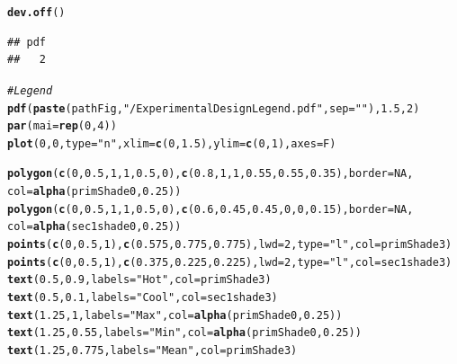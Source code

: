 \documentclass[11pt, oneside]{article}\usepackage[]{graphicx}\usepackage[]{color}
\makeatletter
\newcommand{\hlnum}[1]{\textcolor[rgb]{0.686,0.059,0.569}{#1}}%
\newcommand{\hlstr}[1]{\textcolor[rgb]{0.192,0.494,0.8}{#1}}%
\newcommand{\hlcom}[1]{\textcolor[rgb]{0.678,0.584,0.686}{\textit{#1}}}%
\newcommand{\hlstd}[1]{\textcolor[rgb]{0.345,0.345,0.345}{#1}}%
\newcommand{\hlkwc}[1]{\textcolor[rgb]{0.333,0.667,0.333}{#1}}%
\newcommand{\hlkwd}[1]{\textcolor[rgb]{0.737,0.353,0.396}{\textbf{#1}}}%
\newenvironment{kframe}{%
 \def\at@end@of@kframe{}%
 \ifinner\ifhmode%
  \def\at@end@of@kframe{\end{minipage}}%
  \begin{minipage}{\columnwidth}%
 \fi\fi%
 \def\FrameCommand##1{\hskip\@totalleftmargin \hskip-\fboxsep
 \colorbox{shadecolor}{##1}\hskip-\fboxsep
     \hskip-\linewidth \hskip-\@totalleftmargin \hskip\columnwidth}%
 \MakeFramed {\advance\hsize-\width
   \@totalleftmargin\z@ \linewidth\hsize
   \@setminipage}}%
 {\par\unskip\endMakeFramed%
 \at@end@of@kframe}
\newenvironment{knitrout}{}{} %
\makeatother
\begin{document}
\begin{knitrout}
\begin{kframe}
\begin{alltt}
\hlkwd{dev.off}\hlstd{()}
\end{alltt}
\begin{verbatim}
## pdf 
##   2
\end{verbatim}
\begin{alltt}
\hlcom{# Legend}
\hlkwd{pdf}\hlstd{(}\hlkwd{paste}\hlstd{(pathFig,} \hlstr{"/ExperimentalDesignLegend.pdf"}\hlstd{,} \hlkwc{sep} \hlstd{=} \hlstr{""}\hlstd{),} \hlnum{1.5}\hlstd{,} \hlnum{2}\hlstd{)}
\hlkwd{par}\hlstd{(}\hlkwc{mai} \hlstd{=} \hlkwd{rep}\hlstd{(}\hlnum{0}\hlstd{,} \hlnum{4}\hlstd{))}
\hlkwd{plot}\hlstd{(}\hlnum{0}\hlstd{,} \hlnum{0}\hlstd{,} \hlkwc{type} \hlstd{=} \hlstr{"n"}\hlstd{,} \hlkwc{xlim} \hlstd{=} \hlkwd{c}\hlstd{(}\hlnum{0}\hlstd{,} \hlnum{1.5}\hlstd{),} \hlkwc{ylim} \hlstd{=} \hlkwd{c}\hlstd{(}\hlnum{0}\hlstd{,} \hlnum{1}\hlstd{),} \hlkwc{axes} \hlstd{= F)}

\hlkwd{polygon}\hlstd{(}\hlkwd{c}\hlstd{(}\hlnum{0}\hlstd{,} \hlnum{0.5}\hlstd{,} \hlnum{1}\hlstd{,} \hlnum{1}\hlstd{,} \hlnum{0.5}\hlstd{,} \hlnum{0}\hlstd{),} \hlkwd{c}\hlstd{(}\hlnum{0.8}\hlstd{,} \hlnum{1}\hlstd{,} \hlnum{1}\hlstd{,} \hlnum{0.55}\hlstd{,} \hlnum{0.55}\hlstd{,} \hlnum{0.35}\hlstd{),} \hlkwc{border} \hlstd{=} \hlnum{NA}\hlstd{,}
                                \hlkwc{col} \hlstd{=} \hlkwd{alpha}\hlstd{(primShade0,} \hlnum{0.25}\hlstd{))}
\hlkwd{polygon}\hlstd{(}\hlkwd{c}\hlstd{(}\hlnum{0}\hlstd{,} \hlnum{0.5}\hlstd{,} \hlnum{1}\hlstd{,} \hlnum{1}\hlstd{,} \hlnum{0.5}\hlstd{,} \hlnum{0}\hlstd{),} \hlkwd{c}\hlstd{(}\hlnum{0.6}\hlstd{,} \hlnum{0.45}\hlstd{,} \hlnum{0.45}\hlstd{,} \hlnum{0}\hlstd{,} \hlnum{0}\hlstd{,} \hlnum{0.15}\hlstd{),} \hlkwc{border} \hlstd{=} \hlnum{NA}\hlstd{,}
                                \hlkwc{col} \hlstd{=} \hlkwd{alpha}\hlstd{(sec1shade0,} \hlnum{0.25}\hlstd{))}
\hlkwd{points}\hlstd{(}\hlkwd{c}\hlstd{(}\hlnum{0}\hlstd{,} \hlnum{0.5}\hlstd{,} \hlnum{1}\hlstd{),} \hlkwd{c}\hlstd{(}\hlnum{0.575}\hlstd{,} \hlnum{0.775}\hlstd{,} \hlnum{0.775}\hlstd{),} \hlkwc{lwd} \hlstd{=} \hlnum{2}\hlstd{,} \hlkwc{type} \hlstd{=} \hlstr{"l"}\hlstd{,} \hlkwc{col} \hlstd{= primShade3)}
\hlkwd{points}\hlstd{(}\hlkwd{c}\hlstd{(}\hlnum{0}\hlstd{,} \hlnum{0.5}\hlstd{,} \hlnum{1}\hlstd{),} \hlkwd{c}\hlstd{(}\hlnum{0.375}\hlstd{,} \hlnum{0.225}\hlstd{,} \hlnum{0.225}\hlstd{),} \hlkwc{lwd} \hlstd{=} \hlnum{2}\hlstd{,} \hlkwc{type} \hlstd{=} \hlstr{"l"}\hlstd{,} \hlkwc{col} \hlstd{= sec1shade3)}
\hlkwd{text}\hlstd{(}\hlnum{0.5}\hlstd{,} \hlnum{0.9}\hlstd{,} \hlkwc{labels} \hlstd{=} \hlstr{"Hot"}\hlstd{,} \hlkwc{col} \hlstd{= primShade3)}
\hlkwd{text}\hlstd{(}\hlnum{0.5}\hlstd{,} \hlnum{0.1}\hlstd{,} \hlkwc{labels} \hlstd{=} \hlstr{"Cool"}\hlstd{,} \hlkwc{col} \hlstd{= sec1shade3)}
\hlkwd{text}\hlstd{(}\hlnum{1.25}\hlstd{,} \hlnum{1}\hlstd{,} \hlkwc{labels} \hlstd{=} \hlstr{"Max"}\hlstd{,} \hlkwc{col} \hlstd{=} \hlkwd{alpha}\hlstd{(primShade0,} \hlnum{0.25}\hlstd{))}
\hlkwd{text}\hlstd{(}\hlnum{1.25}\hlstd{,} \hlnum{0.55}\hlstd{,} \hlkwc{labels} \hlstd{=} \hlstr{"Min"}\hlstd{,} \hlkwc{col} \hlstd{=} \hlkwd{alpha}\hlstd{(primShade0,} \hlnum{0.25}\hlstd{))}
\hlkwd{text}\hlstd{(}\hlnum{1.25}\hlstd{,} \hlnum{0.775}\hlstd{,} \hlkwc{labels} \hlstd{=} \hlstr{"Mean"}\hlstd{,} \hlkwc{col} \hlstd{= primShade3)}


\end{alltt}
\end{kframe}
\end{knitrout}
\end{document}

